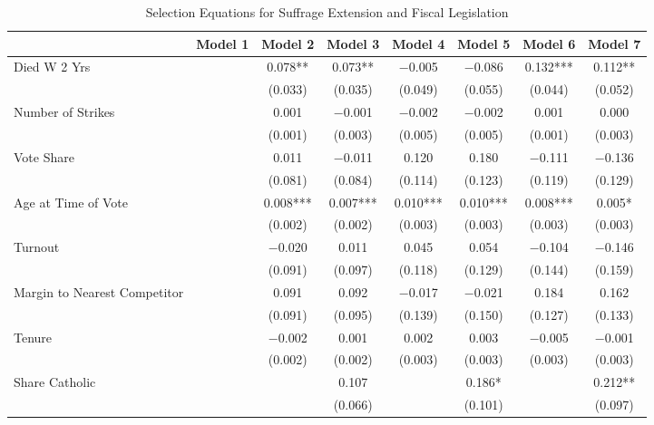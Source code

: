 \begin{table}

\caption{\label{tab:ols_selection}Selection Equations for Suffrage Extension and Fiscal Legislation}
\centering
\begin{tabular}[t]{lccccccc}
\toprule
  & Model 1 & Model 2 & Model 3 & Model 4 & Model 5 & Model 6 & Model 7\\
\midrule
Died W 2 Yrs &  & \num{0.078}** & \num{0.073}** & \num{-0.005} & \num{-0.086} & \num{0.132}*** & \num{0.112}**\\
 &  & (\num{0.033}) & (\num{0.035}) & (\num{0.049}) & (\num{0.055}) & (\num{0.044}) & (\num{0.052})\\
Number of Strikes &  & \num{0.001} & \num{-0.001} & \num{-0.002} & \num{-0.002} & \num{0.001} & \num{0.000}\\
 &  & (\num{0.001}) & (\num{0.003}) & (\num{0.005}) & (\num{0.005}) & (\num{0.001}) & (\num{0.003})\\
Vote Share &  & \num{0.011} & \num{-0.011} & \num{0.120} & \num{0.180} & \num{-0.111} & \num{-0.136}\\
 &  & (\num{0.081}) & (\num{0.084}) & (\num{0.114}) & (\num{0.123}) & (\num{0.119}) & (\num{0.129})\\
Age at Time of Vote &  & \num{0.008}*** & \num{0.007}*** & \num{0.010}*** & \num{0.010}*** & \num{0.008}*** & \num{0.005}*\\
 &  & (\num{0.002}) & (\num{0.002}) & (\num{0.003}) & (\num{0.003}) & (\num{0.003}) & \vphantom{1} (\num{0.003})\\
Turnout &  & \num{-0.020} & \num{0.011} & \num{0.045} & \num{0.054} & \num{-0.104} & \num{-0.146}\\
 &  & (\num{0.091}) & (\num{0.097}) & (\num{0.118}) & (\num{0.129}) & (\num{0.144}) & (\num{0.159})\\
Margin to Nearest Competitor &  & \num{0.091} & \num{0.092} & \num{-0.017} & \num{-0.021} & \num{0.184} & \num{0.162}\\
 &  & (\num{0.091}) & (\num{0.095}) & (\num{0.139}) & (\num{0.150}) & (\num{0.127}) & (\num{0.133})\\
Tenure &  & \num{-0.002} & \num{0.001} & \num{0.002} & \num{0.003} & \num{-0.005} & \num{-0.001}\\
 &  & (\num{0.002}) & (\num{0.002}) & (\num{0.003}) & (\num{0.003}) & (\num{0.003}) & (\num{0.003})\\
Share Catholic &  &  & \num{0.107} &  & \num{0.186}* &  & \num{0.212}**\\
 &  &  & (\num{0.066}) &  & (\num{0.101}) &  & (\num{0.097})\\

\end{tabular}
\end{table}
